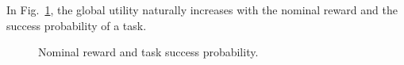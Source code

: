 \documentclass{article}
\begin{document}
In Fig.~\ref{fig:RewardSuccessProbabilityUtility}, the global utility naturally increases with the nominal reward and the success probability of a task.

\begin{figure}
\centering

\caption{Nominal reward and task success probability.}
\label{fig:RewardSuccessProbabilityUtility}
\end{figure}
\end{document}
